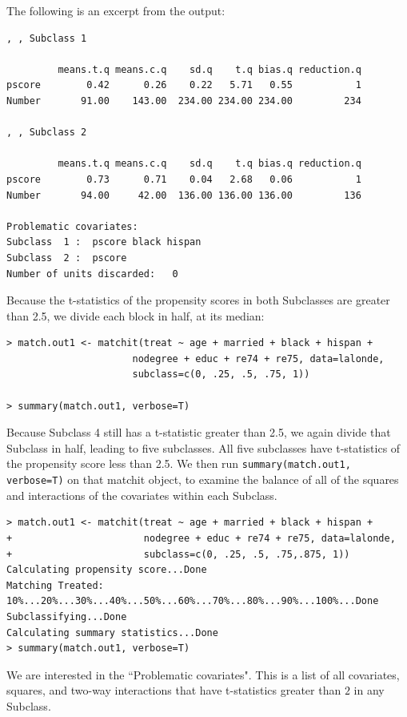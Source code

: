 \documentclass[oneside,letterpaper,titlepage]{article}
\begin{document}
The following is an excerpt from the output:

\begin{verbatim}
, , Subclass 1

         means.t.q means.c.q    sd.q    t.q bias.q reduction.q
pscore        0.42      0.26    0.22   5.71   0.55           1
Number       91.00    143.00  234.00 234.00 234.00         234

, , Subclass 2

         means.t.q means.c.q    sd.q    t.q bias.q reduction.q
pscore        0.73      0.71    0.04   2.68   0.06           1
Number       94.00     42.00  136.00 136.00 136.00         136

Problematic covariates:
Subclass  1 :  pscore black hispan
Subclass  2 :  pscore
Number of units discarded:   0

\end{verbatim}

Because the t-statistics of the propensity scores in both Subclasses
are greater than 2.5, we divide each block in half, at its median:

\begin{verbatim}
> match.out1 <- matchit(treat ~ age + married + black + hispan +
                      nodegree + educ + re74 + re75, data=lalonde,                      
                      subclass=c(0, .25, .5, .75, 1))

> summary(match.out1, verbose=T)
\end{verbatim}

Because Subclass 4 still has a t-statistic greater than 2.5, we again
divide that Subclass in half, leading to five subclasses.  All five
subclasses have t-statistics of the propensity score less than 2.5.
We then run {\tt summary(match.out1, verbose=T)} on that matchit
object, to examine the balance of all of the squares and interactions
of the covariates within each Subclass.

\begin{verbatim}
> match.out1 <- matchit(treat ~ age + married + black + hispan +
+                       nodegree + educ + re74 + re75, data=lalonde,
+                       subclass=c(0, .25, .5, .75,.875, 1))
Calculating propensity score...Done
Matching Treated: 10%...20%...30%...40%...50%...60%...70%...80%...90%...100%...Done
Subclassifying...Done
Calculating summary statistics...Done
> summary(match.out1, verbose=T)
\end{verbatim}

We are interested in the ``Problematic covariates".  This is a list of all covariates, squares, and two-way interactions 
that have t-statistics greater than $2$ in any Subclass.
\end{document}
